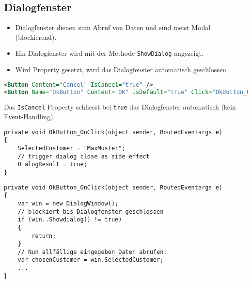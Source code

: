 \subsection{Dialogfenster} 
\begin{itemize}
    \item Dialogfenster dienen zum Abruf von Daten und sind meist Modal (blockierend).
    \item Ein Dialogfenster wird mit der Methode \verb+ShowDialog+ angezeigt. 
    \item Wird Property  gesetzt, wird das Dialogfenster automatisch geschlossen
\end{itemize}

\begin{lstlisting}[language=xml]
<Button Content="Cancel" IsCancel="true" />
<Button Name="OkButton" Content="OK" IsDefault="true" Click="OkButton_OnClick" />
\end{lstlisting}
Das \verb+IsCancel+ Property schliesst bei \verb+true+ das Dialogfenster automatisch (kein Event-Handling).
\begin{lstlisting}
private void OkButton_OnClick(object sender, RoutedEventargs e)
{
    SelectedCustomer = "MaxMuster";
    // trigger dialog close as side effect
    DialogResult = true; 
}
\end{lstlisting}
\begin{lstlisting}[language=sharpc]
private void OkButton_OnClick(object sender, RoutedEventargs e)
{
    var win = new DialogWindow();
    // blockiert bis Dialogfenster geschlossen
    if (win..Showdialog() != true)
    {
        return;
    }
    // Nun allfällige eingegeben Daten abrufen:
    var chosenCustomer = win.SelectedCustomer;
    ...
}
\end{lstlisting}



